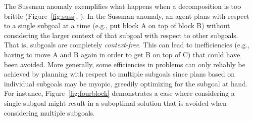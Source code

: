 \documentclass[10pt,letterpaper]{article}
\begin{document}
The Sussman anomaly exemplifies what happens when a decomposition is too  brittle (Figure~\ref{fig:suss}, \citealp{Sussman1975}). In the Sussman anomaly, an agent plans with respect to a single subgoal at a time (e.g., put block A on top of block B) without considering the larger context of that subgoal with respect to other subgoals. That is, subgoals are completely \textit{context-free}. This can lead to inefficiencies (e.g., having to move A and B again in order to get B on top of C) that could have been avoided. More generally, some efficiencies in problems can only reliably be achieved by planning with respect to multiple subgoals since plans based on individual subgoals may be myopic, greedily optimizing for the subgoal at hand. For instance, Figure~\ref{fig:fourblock} demonstrates a case where considering a single subgoal might result in a suboptimal solution that is avoided when considering multiple subgoals. 



\end{document}

